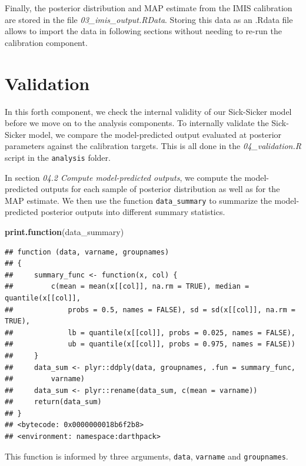 \documentclass[]{book}
\newenvironment{Shaded}{\begin{snugshade}}{\end{snugshade}}
\newcommand{\KeywordTok}[1]{\textcolor[rgb]{0.13,0.29,0.53}{\textbf{#1}}}
\newcommand{\NormalTok}[1]{#1}
\begin{document}
Finally, the posterior distribution and MAP estimate from the IMIS calibration are stored in the file \emph{03\_imis\_output.RData}. Storing this data as an .Rdata file allows to import the data in following sections without needing to re-run the calibration component.

\hypertarget{validation}{%
\chapter{Validation}\label{validation}}

In this forth component, we check the internal validity of our Sick-Sicker model before we move on to the analysis components. To internally validate the Sick-Sicker model, we compare the model-predicted output evaluated at posterior parameters against the calibration targets. This is all done in the \emph{04\_validation.R} script in the \texttt{analysis} folder.

In section \emph{04.2 Compute model-predicted outputs}, we compute the model-predicted outputs for each sample of posterior distribution as well as for the MAP estimate. We then use the function \texttt{data\_summary} to summarize the model-predicted posterior outputs into different summary statistics.

\begin{Shaded}
\begin{Highlighting}[]
\KeywordTok{print.function}\NormalTok{(data_summary)}
\end{Highlighting}
\end{Shaded}

\begin{verbatim}
## function (data, varname, groupnames) 
## {
##     summary_func <- function(x, col) {
##         c(mean = mean(x[[col]], na.rm = TRUE), median = quantile(x[[col]], 
##             probs = 0.5, names = FALSE), sd = sd(x[[col]], na.rm = TRUE), 
##             lb = quantile(x[[col]], probs = 0.025, names = FALSE), 
##             ub = quantile(x[[col]], probs = 0.975, names = FALSE))
##     }
##     data_sum <- plyr::ddply(data, groupnames, .fun = summary_func, 
##         varname)
##     data_sum <- plyr::rename(data_sum, c(mean = varname))
##     return(data_sum)
## }
## <bytecode: 0x0000000018b6f2b8>
## <environment: namespace:darthpack>
\end{verbatim}

This function is informed by three arguments, \texttt{data}, \texttt{varname} and \texttt{groupnames}.
\end{document}

